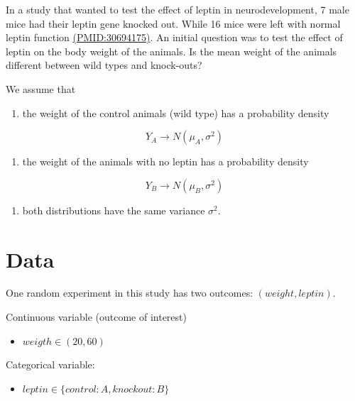 \documentclass[
]{book}
\providecommand{\tightlist}{%
  \setlength{\itemsep}{0pt}\setlength{\parskip}{0pt}}
\begin{document}
In a study that wanted to test the effect of leptin in neurodevelopment, 7 male mice had their leptin gene knocked out. While 16 mice were left with normal leptin function \href{https://pubmed.ncbi.nlm.nih.gov/30694175/}{(PMID:30694175)}. An initial question was to test the effect of leptin on the body weight of the animals. Is the mean weight of the animals different between wild types and knock-outs?

We assume that

\begin{enumerate}
\def\labelenumi{\arabic{enumi}.}
\tightlist
\item
  the weight of the control animals (wild type) has a probability density
\end{enumerate}

\[Y_A \rightarrow N(\mu_A, \sigma^2)\]

\begin{enumerate}
\def\labelenumi{\arabic{enumi}.}
\setcounter{enumi}{1}
\tightlist
\item
  the weight of the animals with no leptin has a probability density
\end{enumerate}

\[Y_B \rightarrow N(\mu_B, \sigma^2)\]

\begin{enumerate}
\def\labelenumi{\arabic{enumi}.}
\setcounter{enumi}{2}
\tightlist
\item
  both distributions have the same variance \(\sigma^2\).
\end{enumerate}

\hypertarget{data-2}{%
\section{Data}\label{data-2}}

One random experiment in this study has two outcomes: \((weight, leptin)\).

Continuous variable (outcome of interest)

\begin{itemize}
\tightlist
\item
  \(weigth \in (20, 60)\)
\end{itemize}

Categorical variable:

\begin{itemize}
\tightlist
\item
  \(leptin \in \{control:A,knockout:B\}\)
\end{itemize}
\end{document}
